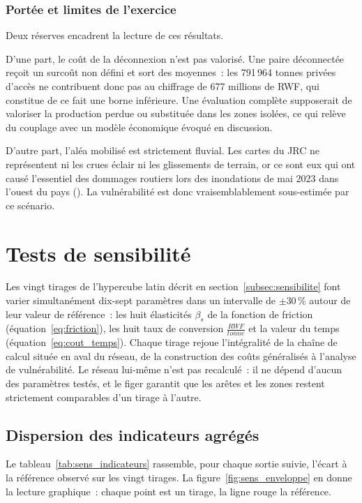 \documentclass[12pt,a4paper,french]{report}
\newcounter{encadre}
\begin{document}
	\subsubsection{Portée et limites de l'exercice}

	Deux réserves encadrent la lecture de ces résultats.

	D'une part, le coût de la déconnexion n'est pas valorisé. Une paire déconnectée reçoit un surcoût non défini et sort des moyennes~: les 791\,964 tonnes privées d'accès ne contribuent donc pas au chiffrage de 677 millions de RWF, qui constitue de ce fait une borne inférieure. Une évaluation complète supposerait de valoriser la production perdue ou substituée dans les zones isolées, ce qui relève du couplage avec un modèle économique évoqué en discussion.

	D'autre part, l'aléa mobilisé est strictement fluvial. Les cartes du JRC ne représentent ni les crues éclair ni les glissements de terrain, or ce sont eux qui ont causé l'essentiel des dommages routiers lors des inondations de mai 2023 dans l'ouest du pays (\cite{MINECOFIN2023}). La vulnérabilité est donc vraisemblablement sous-estimée par ce scénario.
	
	\section{Tests de sensibilité}
	\label{sec:sensibilite}

	Les vingt tirages de l'hypercube latin décrit en section~\ref{subsec:sensibilite} font varier simultanément dix-sept paramètres dans un intervalle de $\pm$30\,\% autour de leur valeur de référence~: les huit élasticités $\beta_s$ de la fonction de friction (équation~\ref{eq:friction}), les huit taux de conversion $\frac{RWF}{tonne}$ et la valeur du temps (équation~\ref{eq:cout_temps}). Chaque tirage rejoue l'intégralité de la chaîne de calcul située en aval du réseau, de la construction des coûts généralisés à l'analyse de vulnérabilité. Le réseau lui-même n'est pas recalculé~: il ne dépend d'aucun des paramètres testés, et le figer garantit que les arêtes et les zones restent strictement comparables d'un tirage à l'autre.

	\subsection{Dispersion des indicateurs agrégés}

	Le tableau~\ref{tab:sens_indicateurs} rassemble, pour chaque sortie suivie, l'écart à la référence observé sur les vingt tirages. La figure~\ref{fig:sens_enveloppe} en donne la lecture graphique~: chaque point est un tirage, la ligne rouge la référence.
\end{document}

